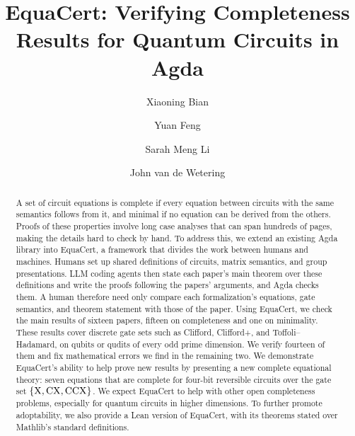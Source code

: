 \documentclass[acmsmall,screen,nonacm]{acmart}
\begin{document}
\title[EquaCert: Verifying Completeness Results for Quantum Circuits in Agda]{EquaCert: Verifying Completeness Results for Quantum Circuits in Agda}

\author{Xiaoning Bian}
\author{Yuan Feng}
\author{Sarah Meng Li}
\author{John van de Wetering}

\begin{abstract}
A set of circuit equations is complete if every equation between circuits with the same semantics follows from it, and minimal if no equation can be derived from the others. Proofs of these properties involve long case analyses that can span hundreds of pages, making the details hard to check by hand. To address this, we extend an existing Agda library into EquaCert, a framework that divides the work between humans and machines. Humans set up shared definitions of circuits, matrix semantics, and group presentations. LLM coding agents then state each paper's main theorem over these definitions and write the proofs following the papers' arguments, and Agda checks them. A human therefore need only compare each formalization's equations, gate semantics, and theorem statement with those of the paper. Using EquaCert, we check the main results of sixteen papers, fifteen on completeness and one on minimality. These results cover discrete gate sets such as Clifford, Clifford+\T, and Toffoli--Hadamard, on qubits or qudits of every odd prime dimension. We verify fourteen of them and fix mathematical errors we find in the remaining two. We demonstrate EquaCert's ability to help prove new results by presenting a new complete equational theory: seven equations that are complete for four-bit reversible circuits over the gate set $\{\mathrm{X},\mathrm{CX},\mathrm{CCX}\}$. We expect EquaCert to help with other open completeness problems, especially for quantum circuits in higher dimensions. To further promote adoptability, we also provide a Lean version of EquaCert, with its theorems stated over Mathlib's standard definitions.
\end{abstract}
\end{document}
